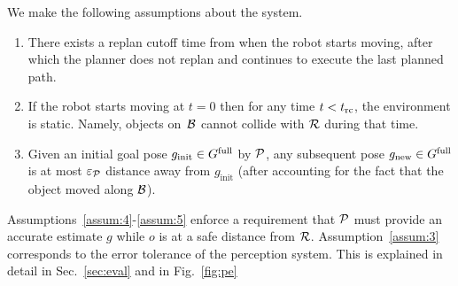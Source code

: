 \documentclass[a4paper,10pt]{article}
\begin{document}
We make the following assumptions about the system.
\begin{enumerate}[label={\textbf{A\arabic*}},leftmargin=0.75cm]
    

 
    \item \label{assum:4} There exists a replan cutoff time \Trc from when the robot starts moving, after which the planner does not replan and continues to execute the last planned path.

    \item \label{assum:5} If the robot starts moving at $t = 0$ then for any time $t < t_{\textrm{rc}}$, the environment is static. Namely, objects on~$\mathcal{B}$ cannot collide with $\mathcal{R}$ during that time.
    
    \item \label{assum:3} Given an initial goal pose $g_{\textrm{init}} \in G^{\textrm{full}}$ by $\mathcal{P}$, any subsequent pose $g_{\textrm{new}} \in G^{\textrm{full}}$ is at most $\varepsilon_\mathcal{P}$ distance away from $g_{\textrm{init}}$ (after accounting for the fact that the object moved along $\mathcal{B}$).
    

\end{enumerate}

Assumptions~\ref{assum:4}-\ref{assum:5} enforce a requirement that $\mathcal{P}$ must provide an accurate estimate $g$ while $o$ is at a safe distance from $\mathcal{R}$.
%
Assumption~\ref{assum:3} corresponds to the error tolerance of the perception system. This is explained in detail in Sec.~\ref{sec:eval} and in Fig.~\ref{fig:pe}
\end{document}
